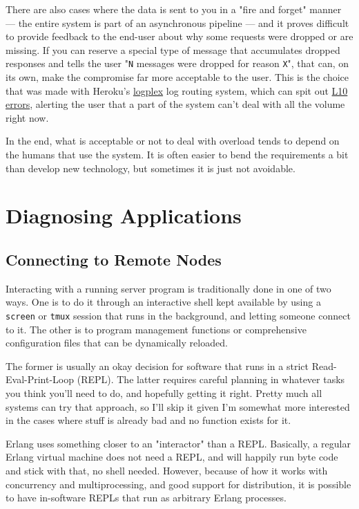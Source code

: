 \documentclass[11pt, oneside]{book}   	%
\newcommand{\app}[1]{\Verb`#1`}
\newcommand{\var}[1]{\Verb`#1`}
\begin{document}
There are also cases where the data is sent to you in a "fire and forget" manner — the entire system is part of an asynchronous pipeline — and it proves difficult to provide feedback to the end-user about why some requests were dropped or are missing. If you can reserve a special type of message that accumulates dropped responses and tells the user "\var{N} messages were dropped for reason \var{X}", that can, on its own, make the compromise far more acceptable to the user. This is the choice that was made with Heroku's \href{https://devcenter.heroku.com/articles/logplex}{logplex} log routing system, which can spit out \href{https://devcenter.heroku.com/articles/error-codes\#l10-drain-buffer-overflow}{L10 errors}, alerting the user that a part of the system can't deal with all the volume right now.

In the end, what is acceptable or not to deal with overload tends to depend on the humans that use the system. It is often easier to bend the requirements a bit than develop new technology, but sometimes it is just not avoidable.


\part{Diagnosing Applications}
\label{part:diagnosing-applictions}


\chapter{Connecting to Remote Nodes}
\label{chap:connecting}

Interacting with a running server program is traditionally done in one of two ways. One is to do it through an interactive shell kept available by using a \app{screen} or \app{tmux} session that runs in the background, and letting someone connect to it. The other is to program management functions or comprehensive configuration files that can be dynamically reloaded.

The former is usually an okay decision for software that runs in a strict Read-Eval-Print-Loop (REPL). The latter requires careful planning in whatever tasks you think you'll need to do, and hopefully getting it right. Pretty much all systems can try that approach, so I'll skip it given I'm somewhat more interested in the cases where stuff is already bad and no function exists for it.

Erlang uses something closer to an "interactor" than a REPL. Basically, a regular Erlang virtual machine does not need a REPL, and will happily run byte code and stick with that, no shell needed. However, because of how it works with concurrency and multiprocessing, and good support for distribution, it is possible to have in-software REPLs that run as arbitrary Erlang processes.
\end{document}
